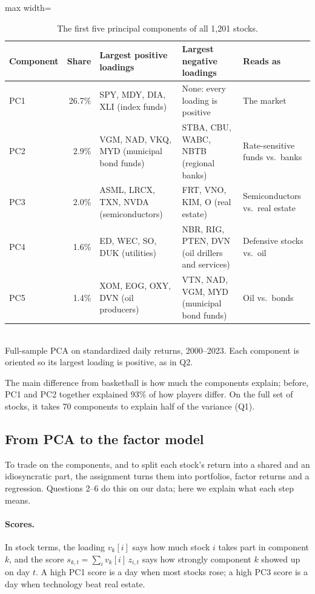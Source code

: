 \documentclass[12pt,letterpaper]{article}
\begin{document}
\begin{table}[!htbp]
\centering
\caption{The first five principal components of all 1,201 stocks.}
\label{tab:primer-full}
\small
\setlength{\tabcolsep}{4pt}
\begin{adjustbox}{max width=\linewidth}
\begin{tabular}{lr >{\raggedright\arraybackslash}p{3.6cm} >{\raggedright\arraybackslash}p{3.6cm} >{\raggedright\arraybackslash}p{3.2cm}}
\toprule
Component & Share & Largest positive loadings & Largest negative loadings & Reads as \\
\midrule
PC1 & 26.7\% & SPY, MDY, DIA, XLI (index funds) & None: every loading is positive & The market \\
\addlinespace
PC2 & 2.9\% & VGM, NAD, VKQ, MYD (municipal bond funds) & STBA, CBU, WABC, NBTB (regional banks) & Rate-sensitive funds vs.\ banks \\
\addlinespace
PC3 & 2.0\% & ASML, LRCX, TXN, NVDA (semiconductors) & FRT, VNO, KIM, O (real estate) & Semiconductors vs.\ real estate \\
\addlinespace
PC4 & 1.6\% & ED, WEC, SO, DUK (utilities) & NBR, RIG, PTEN, DVN (oil drillers and services) & Defensive stocks vs.\ oil \\
\addlinespace
PC5 & 1.4\% & XOM, EOG, OXY, DVN (oil producers) & VTN, NAD, VGM, MYD (municipal bond funds) & Oil vs.\ bonds \\
\bottomrule
\end{tabular}
\end{adjustbox}
\\[4pt]
\small Full-sample PCA on standardized daily returns, 2000--2023. Each
component is oriented so its largest loading is positive, as in Q2.
\end{table}
The main difference from basketball is how much the components explain; before, PC1 and PC2 together explained $93\%$ of how players differ. On the full set of stocks, it takes 70 components to explain half of the variance (Q1). 
\subsection{From PCA to the factor model}
To trade on the components, and to split each stock's return into a
shared and an idiosyncratic part, the assignment turns them into
portfolios, factor returns and a regression. Questions 2--6 do this on
our data; here we explain what each step means.

\paragraph{Scores.} In stock terms, the loading $v_k[i]$ says how much
stock $i$ takes part in component $k$, and the score
$s_{k,t}=\sum_i v_k[i]\,z_{i,t}$ says how strongly component $k$ showed up
on day $t$. A high PC1 score is a day when most stocks rose; a high PC3
score is a day when technology beat real estate.
\end{document}
